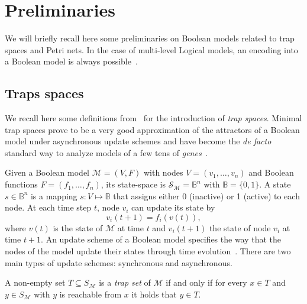 \documentclass[runningheads]{llncs}
\newcommand{\vangiang}[1]{\textcolor{magenta}{#1}}
\newcommand{\sylvain}[1]{\textcolor{teal}{#1}}
\begin{document}
\section{Preliminaries}

We will briefly recall here some preliminaries on Boolean models related to trap spaces and Petri nets.
In the case of multi-level Logical models, an encoding into a Boolean model is always possible~\cite{Didier2011}.

\subsection{Traps spaces}


We recall here some definitions from~\cite{klarner2015computing} for the introduction of \emph{trap spaces}.
Minimal trap spaces prove to be a very good approximation of the attractors of a Boolean model under asynchronous update schemes and have become the \emph{de facto} standard way to analyze models of a few tens of \emph{genes}~\cite{klarner2017pyboolnet,cifuentes2020control}.

Given a Boolean model \(\mathcal{M} = (V, F)\) with nodes \(V=(v_{1},\dots,v_{n})\) and Boolean functions \(F=(f_{1},\dots,f_{n})\), its state-space is \(\mathcal{S}_{\mathcal{M}} =\mathbb{B}^{n}\) with \(\mathbb{B} = \{0, 1\}\). A state \(s \in \mathbb{B}^{n}\) is a mapping \(s : V \mapsto \mathbb{B}\) that assigns either 0 (inactive) or 1 (active) to each node. At each time step \(t\), node \(v_i\) can update its state by
\[v_i(t + 1) = f_i(v(t)),\] where \(v(t)\) is the state of \(\mathcal{M}\) at time \(t\) and \(v_i(t + 1)\) the state of node \(v_i\) at time \(t + 1\). An update scheme of a Boolean model specifies the way that the nodes of the model update their states through time evolution~\cite{thomas1991regulatory}. There are two main types of update schemes: synchronous and asynchronous.

A non-empty set \(T \subseteq S_{\mathcal{M}}\) is a \emph{trap set} of \(\mathcal{M}\) if and only if for every \(x \in T\) and \(y \in S_{\mathcal{M}}\) with \(y\) is reachable from \(x\) it holds that \(y \in T\).
\end{document}

